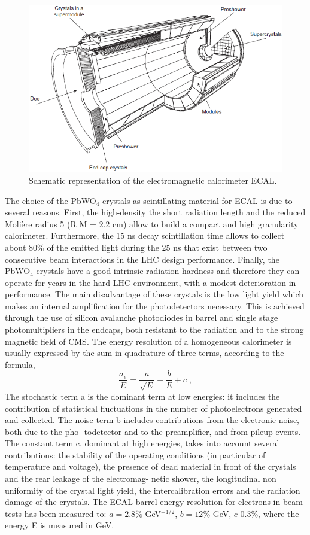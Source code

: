 \begin{figure}
\centering
\includegraphics[scale= 0.5]{../Cap2/ecal_all}
\caption{Schematic representation of the electromagnetic calorimeter ECAL.}
\label{ecal_all}
\end{figure}
The choice of the PbWO$_4$ crystals as scintillating material for ECAL is due to several
reasons. First, the high-density the short radiation length  and the reduced Molière radius 5 (R M = 2.2 cm) allow to build a compact and
high granularity calorimeter. Furthermore, the 15 ns decay scintillation time allows to
collect about 80\% of the emitted light during the 25 ns that exist between two consecutive
beam interactions in the LHC design performance. Finally, the PbWO$_4$ crystals have a
good intrinsic radiation hardness and therefore they can operate for years in the hard
LHC environment, with a modest deterioration in performance. The main disadvantage
of these crystals is the low light yield  which makes an internal
amplification for the photodetectors necessary. This is achieved through the use of silicon
avalanche photodiodes  in barrel and single stage photomultipliers  in the endcaps, both resistant to the radiation and to the strong
magnetic field of CMS.
The energy resolution of a homogeneous calorimeter is usually expressed by the sum
in quadrature of three terms, according to the formula,
\begin{equation}
\frac{\sigma_e}{E}=\frac{a}{\sqrt{E}} + \frac{b}{E} + c \; ,
\end{equation}
The stochastic term a is the dominant term at low energies: it includes the contribution
of statistical fluctuations in the number of photoelectrons generated and collected.
The noise term b includes contributions from the electronic noise, both due to the pho-
todetector and to the preamplifier, and from pileup events.
The constant term c, dominant at high energies, takes into account several contributions:
the stability of the operating conditions (in particular of temperature and voltage), the
presence of dead material in front of the crystals and the rear leakage of the electromag-
netic shower, the longitudinal non uniformity of the crystal light yield, the intercalibration
errors and the radiation damage of the crystals.
The ECAL barrel energy resolution for electrons in beam tests has been measured to: $a=2.8\%$ GeV$^{-1/2}$, $b=12\%$ GeV, $c$ 0.3\%, where the energy E is measured in GeV.

